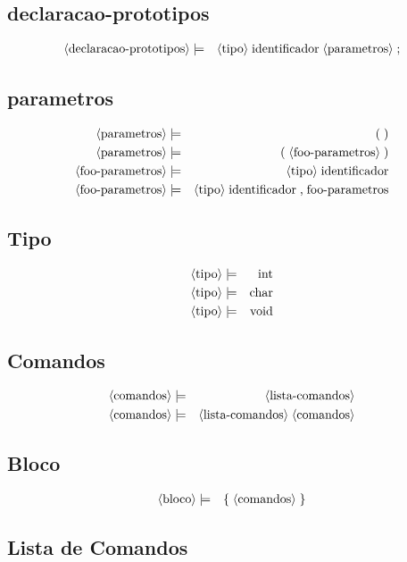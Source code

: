 \documentclass[12pt,a4papper]{article}
\newcommand{\pn}[1]{\langle \textnormal{#1} \rangle}
\newcommand{\pp}{\models}
\newcommand{\ww}{\;}
\newcommand{\sm}[1]{\textnormal{#1}}
\begin{document}
\begin{landscape}
\subsection{declaracao-prototipos}
\begin{eqnarray}
\pn{declaracao-prototipos} &\pp& \pn{tipo} \ww \sm{identificador} \ww \pn{parametros} \ww \sm{;}
\end{eqnarray}


\subsection{parametros}
\begin{eqnarray}
\pn{parametros} &\pp& \sm{(} \ww \sm{)} \\
\pn{parametros} &\pp& \sm{(} \ww \pn{foo-parametros} \ww \sm{)} \\
\pn{foo-parametros} &\pp& \pn{tipo} \ww \sm{identificador} \\
\pn{foo-parametros} &\pp& \pn{tipo} \ww \sm{identificador} \ww \sm{,} \ww \sm{foo-parametros}
\end{eqnarray}


\subsection{Tipo}
\begin{eqnarray}
        \pn{tipo} &\pp& \sm{int} \\
        \pn{tipo} &\pp& \sm{char} \\
        \pn{tipo} &\pp& \sm{void} 
\end{eqnarray}


\subsection{Comandos}
\begin{eqnarray}
\pn{comandos} &\pp& \pn{lista-comandos} \\
\pn{comandos} &\pp& \pn{lista-comandos} \ww \pn{comandos} 
\end{eqnarray}


\subsection{Bloco}
\begin{eqnarray}
        \pn{bloco} &\pp& \sm{\{} \ww \pn{comandos} \ww \sm{\}}
\end{eqnarray}


\subsection{Lista de Comandos}


\end{landscape}
\end{document}
